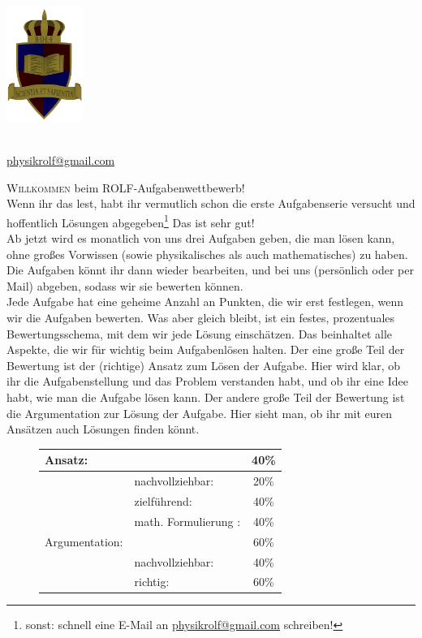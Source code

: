 \documentclass[a4paper]{article}
\begin{document}
	\vspace*{-2cm}
	\parbox{4cm}{\includegraphics[width=2.5cm]{../images/ROLF4.png}}
	\parbox{10.6cm}{ \\  \href{mailto:physikrolf@gmail.com}{physikrolf@gmail.com} \\ \vspace*{-.5cm} }
\thispagestyle{empty}	
\vspace{1cm}
\noindent
\newline
\textsc{Willkommen} beim ROLF-Aufgabenwettbewerb!\\
Wenn ihr das lest, habt ihr vermutlich schon die erste Aufgabenserie versucht und hoffentlich Lösungen abgegeben\footnote{sonst: schnell eine E-Mail an  \href{mailto:physikrolf@gmail.com}{physikrolf@gmail.com} schreiben!} Das ist sehr gut!\\
Ab jetzt wird es monatlich von uns drei Aufgaben geben, die man lösen kann, ohne großes Vorwissen (sowie physikalisches als auch mathematisches) zu haben.  Die Aufgaben könnt ihr dann wieder bearbeiten, und bei uns (persönlich oder per Mail) abgeben, sodass wir sie bewerten können.\\
Jede Aufgabe hat eine geheime Anzahl an Punkten, die wir erst festlegen, wenn wir die Aufgaben bewerten. Was aber gleich bleibt, ist ein festes, prozentuales Bewertungsschema, mit dem wir jede Lösung einschätzen. Das beinhaltet alle Aspekte, die wir für wichtig beim Aufgabenlösen halten. Der eine große Teil der Bewertung ist der (richtige) Ansatz zum Lösen der Aufgabe. Hier wird klar, ob ihr die Aufgabenstellung und das Problem verstanden habt, und ob ihr eine Idee habt, wie man die Aufgabe lösen kann. Der andere große Teil der Bewertung ist die Argumentation zur Lösung der Aufgabe. Hier sieht man, ob ihr mit euren Ansätzen auch Lösungen finden könnt. 
\newline
\begin{figure}[h]
	\centering
\begin{tabular}{l| l c}
	Ansatz: & & 40\%\\\hline
	& nachvollziehbar:&20\%\\
	&zielführend:&40\%\\
	&math. Formulierung :& 40\%\\\hline\hline
	Argumentation:& &60\% \\\hline
	&nachvollziehbar:&40\%\\
	&richtig:&60\%\\\hline
	
\end{tabular}
\end{figure}
\end{document}
